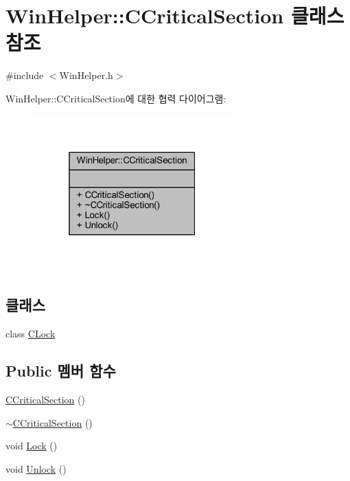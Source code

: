 \hypertarget{class_win_helper_1_1_c_critical_section}{}\section{Win\+Helper\+:\+:C\+Critical\+Section 클래스 참조}
\label{class_win_helper_1_1_c_critical_section}


{\ttfamily \#include $<$Win\+Helper.\+h$>$}



Win\+Helper\+:\+:C\+Critical\+Section에 대한 협력 다이어그램\+:\nopagebreak
\begin{figure}[H]
\begin{center}
\leavevmode
\includegraphics[width=217pt]{class_win_helper_1_1_c_critical_section__coll__graph}
\end{center}
\end{figure}
\subsection*{클래스}
\begin{DoxyCompactItemize}
\item 
class \mbox{\hyperlink{class_win_helper_1_1_c_critical_section_1_1_c_lock}{C\+Lock}}
\end{DoxyCompactItemize}
\subsection*{Public 멤버 함수}
\begin{DoxyCompactItemize}
\item 
\mbox{\hyperlink{class_win_helper_1_1_c_critical_section_af047b09968c6b2f536d1117ff8adf082}{C\+Critical\+Section}} ()
\item 
\mbox{\hyperlink{class_win_helper_1_1_c_critical_section_a11de0da96b9daaff655c6193aba120c6}{$\sim$\+C\+Critical\+Section}} ()
\item 
void \mbox{\hyperlink{class_win_helper_1_1_c_critical_section_aa0c20ee0e7de698b37c26a295d0f45fe}{Lock}} ()
\item 
void \mbox{\hyperlink{class_win_helper_1_1_c_critical_section_a32b6fc61701020c400f3bb9b5e00bf12}{Unlock}} ()
\end{DoxyCompactItemize}


